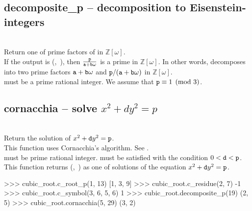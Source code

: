   \subsection{decomposite\_p -- decomposition to Eisenstein-integers}
   \\
   \spacing
   \quad Return one of prime factors of  in $\mathbb{Z}[\omega]$.\\
   \spacing
   \quad If the output is (,\ ), then $\frac{{\texttt p}}{{\texttt a}+{\texttt b}\omega}$ is a prime in $\mathbb{Z}[\omega]$.
   In other words,  decomposes into two prime factors ${\texttt a}+{\texttt b}\omega$ and ${\texttt p}/({\texttt a}+{\texttt b}\omega)$ in $\mathbb{Z}[\omega]$.\\
   \spacing
   \quad {} must be a prime rational integer.
   We assume that ${\texttt p}\equiv 1 \pmod 3$.\\
%
  \subsection{cornacchia -- solve $x^2+dy^2=p$}
   \\
   \spacing
   \quad Return the solution of $x^2 + {\texttt d}y^2 = {\texttt p}$.\\
   \spacing
   \quad This function uses Cornacchia's algorithm. See \cite{Cohen1}.\\
   \spacing
   \quad {} must be prime rational integer.
    must be satisfied with the condition $0<{\texttt d}<{\texttt p}$.
   This function returns (,\ ) as one of solutions of the equation $x^2 + {\texttt d} y^2 = {\texttt p}$.\\
%
\begin{ex}
>>> cubic_root.c_root_p(1, 13)
[1, 3, 9]
>>> cubic_root.c_residue(2, 7)
-1
>>> cubic_root.c_symbol(3, 6, 5, 6)
1
>>> cubic_root.decomposite_p(19)
(2, 5)
>>> cubic_root.cornacchia(5, 29)
(3, 2)
\end{ex}%
\C



